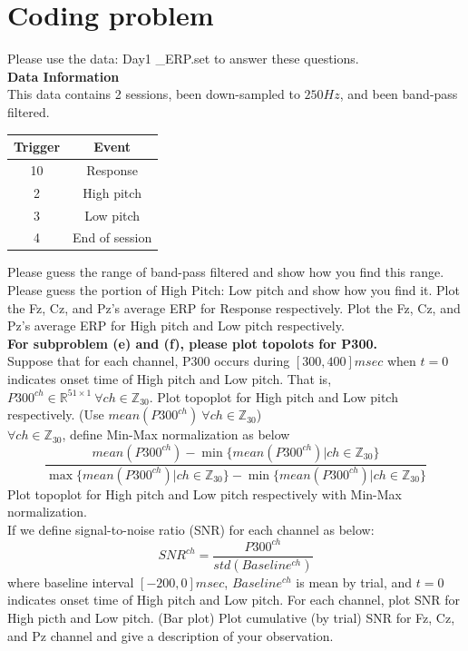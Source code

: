 \documentclass[a4 paper]{article}
\begin{document}
\section{Coding problem}
\begin{tcolorbox}[colback=RubineRed!5!white,colframe=RubineRed!75!black]
Please use the data: Day1 \_ERP.set to answer these questions.\\
\textbf{Data Information}\\
This data contains 2 sessions, been down-sampled to $250Hz$, and been band-pass filtered.
\begin{center}
   \begin{tabular}{||c|c||}
    \hline
    Trigger & Event\\
    \hline
     10 & Response \\
     2 & High pitch\\
     3 & Low pitch\\
     4 & End of session\\
     \hline
    \end{tabular}
\end{center}
 Please guess the range of band-pass filtered and show how you find this range.
 Please guess the portion of High Pitch: Low pitch and show how you find it. 
 Plot the Fz, Cz, and Pz's average ERP for Response respectively.
 Plot the Fz, Cz, and Pz's average ERP for High pitch and Low pitch respectively.\\
\tcblower
\textbf{For subproblem (e) and (f), please plot topolots for P300.}\\
Suppose that for each channel, P300 occurs during $[300,400]msec$ when $t=0$ indicates onset time of High pitch and Low pitch. That is, $P300^{ch}\in\mathbb{R}^{51\times1} \ \forall ch\in\mathbb{Z}_{30}$.
 Plot topoplot for High pitch and Low pitch respectively. (Use $mean(P300^{ch}) \ \forall ch\in\mathbb{Z}_{30}$) \\
$\forall ch\in\mathbb{Z}_{30}$, define Min-Max normalization as below
\begin{equation}
    \frac{mean(P300^{ch})-\min{\big\{mean(P300^{ch})\big|ch\in\mathbb{Z}_{30}\big\}}}{\max{\big\{mean(P300^{ch})\big|ch\in\mathbb{Z}_{30}\big\}}-\min{\big\{mean(P300^{ch})\big|ch\in\mathbb{Z}_{30}\big\}}}
\end{equation}
 Plot topoplot for High pitch and Low pitch respectively with Min-Max normalization.
\\If we define signal-to-noise ratio (SNR) for each channel as below:
\begin{equation}
    SNR^{ch}=
    \frac{P300^{ch}}{std{(Baseline^{ch})}}
\end{equation}
where baseline interval $[-200, 0]msec$, $Baseline^{ch}$ is mean by trial, and $t=0$ indicates onset time of High pitch and Low pitch. 
 For each channel, plot SNR for High picth and Low pitch. (Bar plot)
 Plot cumulative (by trial) SNR for  Fz, Cz, and Pz channel and give a description of your observation.
\end{tcolorbox}
\end{document}
